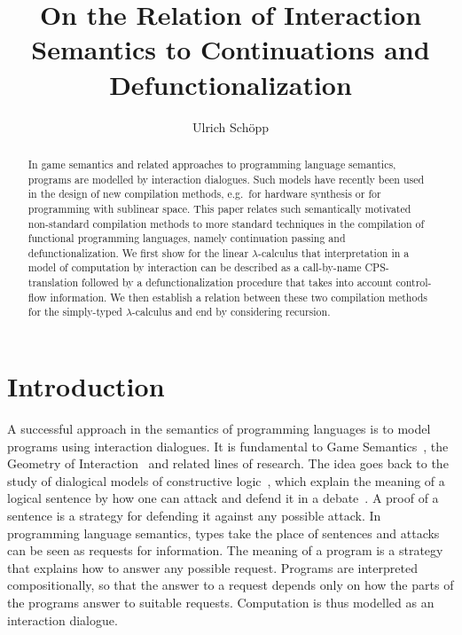 \documentclass{LMCS}
\theoremstyle{definition}
\theoremstyle{plain}
\begin{document}
\title[Interaction Semantics, Continuations and
  Defunctionalization] {On the Relation of Interaction Semantics to
  Continuations and Defunctionalization}

\author[U.~Schöpp]{Ulrich Schöpp}
\address{Ludwig-Maximilians-Universität München, Germany}


\begin{abstract}
  \noindent
  In game semantics and related approaches to programming 
  language semantics, programs are modelled by interaction
  dialogues.  Such models have recently been used in the design of new compilation methods,  
  e.g.~for hardware synthesis or for programming with sublinear space.
This paper relates such semantically motivated non-standard
  compilation methods to more standard techniques in the compilation
  of functional programming languages, namely continuation passing and
  defunctionalization. We first show for the linear $\lambda$-calculus that
  interpretation in a model of computation by interaction can be
  described as a call-by-name CPS-translation followed by a
  defunctionalization procedure that takes into account control-flow
  information. 
  We then establish a 
  relation between these two compilation methods for the 
  simply-typed $\lambda$-calculus and end by considering recursion.
\end{abstract}

\maketitle

\section{Introduction}

A successful approach in the semantics of programming languages is to model
programs using interaction dialogues.
It is fundamental to Game Semantics~\cite{HylandOng,AbramskyJM00},
the Geometry of Interaction~\cite{Girard89} and
related lines of research.
The idea goes back to the study of dialogical models of 
constructive logic~\cite{lorenzen1961dk},
which explain the meaning of a logical sentence 
by how one can attack and defend it in a 
debate~\cite{DBLP:journals/apal/Blass92}. A proof of a
sentence is a strategy for defending it against any possible attack.  In
programming language semantics, types take the place of sentences and attacks
can be seen as requests for information. The meaning of a program is
a strategy that explains how to answer any possible request.
Programs are interpreted compositionally, so that the answer
to a request depends only on how the parts of the programs answer
to suitable requests. Computation is thus modelled as an interaction
dialogue.
\end{document}
